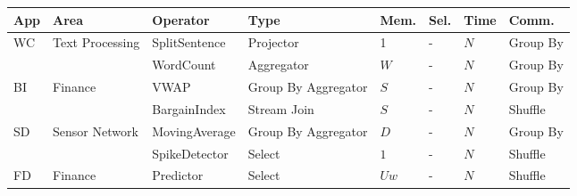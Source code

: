 \documentclass[ppgc,diss,english]{iiufrgs}
\begin{document}
\begin{table}[h]
\begin{center}
	\footnotesize
	\begin{tabular}{ | l | p{2.5cm} | p{2.5cm} | p{2cm} | l | l | l | p{1.5cm} | }
    		\hline
    		\textbf{App} & \textbf{Area} & \textbf{Operator} & \textbf{Type} & \textbf{Mem.} & \textbf{Sel.} & \textbf{Time} & \textbf{Comm.} \\ \hline
    		\multirow{2}{*}{WC} & \multirow{2}{*}{Text Processing} & SplitSentence & Projector & 1   & - & $N$ & Group By \\\cline{3-8}
    					        &                                  & WordCount     & Aggregator & $W$ & - & $N$ & Group By \\\hline
    					                
    					                  
    		\multirow{2}{*}{BI} & \multirow{2}{*}{Finance} & VWAP         & Group By Aggregator & $S$ & - & $N$ & Group By \\\cline{3-8}
    					        &                          & BargainIndex & Stream Join         & $S$ & - & $N$ & Shuffle \\\hline
    					                   
    		\multirow{2}{*}{SD} & \multirow{2}{*}{Sensor Network} & MovingAverage  & Group By Aggregator & $D$ & - & $N$ & Group By \\\cline{3-8}
    					        &                                 & SpikeDetector  & Select              & $1$ & - & $N$ & Shuffle \\\hline
    					                   
    					                   
    		\multirow{1}{*}{FD} & \multirow{1}{*}{Finance} & Predictor & Select & $Uw$ & - & $N$ & Shuffle \\\hline
    		

\end{tabular}
\end{center}
\end{table}
\end{document}
